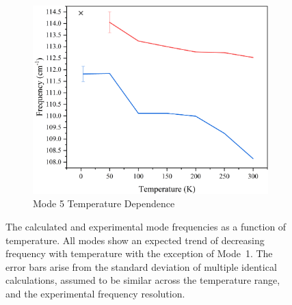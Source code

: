 \begin{figure}
\begin{subfigure}{0.45\textwidth}
\centering
\includegraphics[width=\textwidth]{Figures/Misc/QHA/Mode5CompV2G.png}
\caption{Mode 5 Temperature Dependence}
\label{fig:mode5temp}
\end{subfigure}
\captionsetup{font = footnotesize, justification = centering}
\caption[The Calculated and Experimental Mode Frequencies as a Function of Temperature]{The calculated and experimental mode frequencies as a function of temperature. All modes show an expected trend of decreasing frequency with temperature with the exception of Mode~1. The error bars arise from the standard deviation of multiple identical calculations, assumed to be similar across the temperature range, and the experimental frequency resolution. }
\label{Fig:ModeTempShift}
\end{figure}

